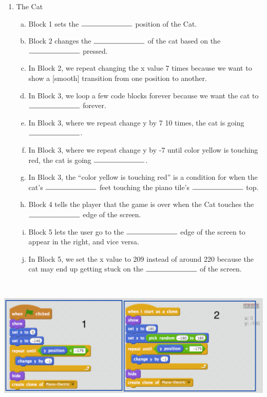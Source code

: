 \documentclass[11pt]{article}
\begin{document}
\begin{enumerate}
\item The Cat
\begin{enumerate}[a.]
\item Block 1 sets the $\rule{2.5cm}{0.15mm}$ position of the Cat.
\item Block 2 changes the $\rule{2.5cm}{0.15mm}$ of the cat based on the $\rule{2.5cm}{0.15mm}$ pressed.
\item In Block 2, we repeat changing the x value 7 times because we want to show a [smooth] transition from one position to another.
\item In Block 3, we loop a few code blocks forever because we want the cat to $\rule{2.5cm}{0.15mm}$ forever.
\item In Block 3, where we repeat change y by 7 10 times, the cat is going $\rule{2.5cm}{0.15mm}$.
\item In Block 3, where we repeat change y by -7 until color yellow is touching red, the cat is going $\rule{2.5cm}{0.15mm}$.
\item In Block 3, the ``color yellow is touching red'' is a condition for when the cat's $\rule{2.5cm}{0.15mm}$ feet touching the piano tile's $\rule{2.5cm}{0.15mm}$ top.
\item Block 4 tells the player that the game is over when the Cat touches the $\rule{2.5cm}{0.15mm}$ edge of the screen.
\item Block 5 lets the user go to the $\rule{2.5cm}{0.15mm}$ edge of the screen to appear in the right, and vice versa.
\item In Block 5, we set the x value to 209 instead of around 220 because the cat may end up getting stuck on the $\rule{2.5cm}{0.15mm}$ of the screen.
\end{enumerate}
\end{enumerate}
\noindent\makebox[\linewidth]{\rule{\paperwidth}{0.4pt}}\\
\begin{center}
  \includegraphics[width=5.5in]{block.png}
 \end{center}
\end{document}

